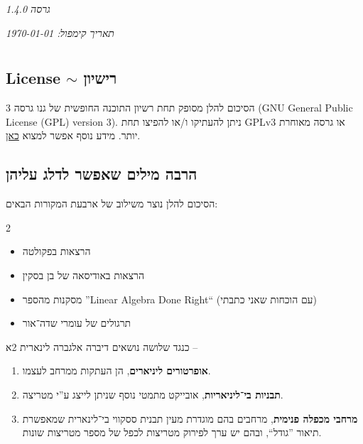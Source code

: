 \documentclass[name=רשימות אלגברה לינארית 2א]{../../../tex/classes/megasumPreamble}
\author{שחר פרץ}
\title{\name}
\date{2025 סמסטר ב'}
\begin{document}
	\renewcommand{\footrule}{\rule{\linewidth-19pt}{0.25pt}\vspace{-5pt}}
	
	\newpage
	
	\hfil \textit{גרסה 1.4.0}
	
	\hfil \textit{תאריך קימפול: \today}
	
	\section[מבוא]{}
	\subsection[רישיון]{License $\sim$ רישיון}
	
	הסיכום להלן מסופק תחת רשיון התוכנה החופשית של גנו גרסה 3 (GNU General Public License (GPL) version 3). ניתן להעתיקו ו/או להפיצו תחת GPLv3 או גרסה מאוחרת יותר. מידע נוסף אפשר למצוא \href{https://www.gnu.org/licenses}{כאן}. 
	
	\subsection{הרבה מילים שאפשר לדלג עליהן}
	הסיכום להלן נוצר משילוב של ארבעת המקורות הבאים: 
	\begin{multicols}{2}
		\begin{itemize}
			\item הרצאות בפקולטה
			\item הרצאות באודיסאה של בן בסקין
			\item מסקנות מהספר ''Linear Algebra Done Right`` (עם הוכחות שאני כתבתי)
			\item תרגולים של עומרי שדה־אור
		\end{itemize}
	\end{multicols}
	
	כנגד שלושה נושאים דיברה אלגברה לינארית 2א –
	\begin{enumerate}
		\item \textbf{אופרטורים ליניארים}, הן העתקות ממרחב לעצמו. 
		\item \textbf{תבניות בי־ליניאריות}, אובייקט מתמטי נוסף שניתן לייצג ע''י מטריצה. 
		\item \textbf{מרחבי מכפלה פנימית}, מרחבים בהם מוגדרת מעין תבנית ססקווי בי־לינארית שמאפשרת תיאור ''גודל``, ובהם יש ערך לפירוק מטריצות לכפל של מספר מטריצות שונות. 
	\end{enumerate}
	
\end{document}
